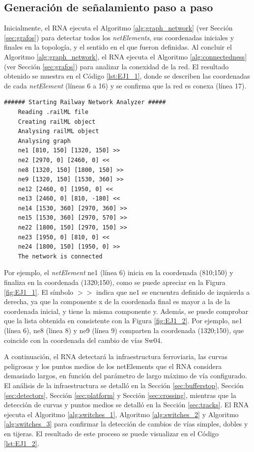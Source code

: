 \subsection{Generación de señalamiento paso a paso}
	
	Inicialmente, el RNA ejecuta el Algoritmo \ref{alg:graph_network} (ver Sección \ref{sec:grafos}) para detectar todos los \textit{netElements}, sus coordenadas iniciales y finales en la topología, y el sentido en el que fueron definidas. Al concluir el Algoritmo \ref{alg:graph_network}, el RNA ejecuta el Algoritmo \ref{alg:connectedness} (ver Sección \ref{sec:grafos}) para analizar la conexidad de la red. El resultado obtenido se muestra en el Código \ref{lst:EJ1_1}, donde se describen las coordenadas de cada \textit{netElement} (líneas 6 a 16) y se confirma que la red es conexa (línea 17).
	
	\begin{lstlisting}[language = {}, caption = Detección de \textit{netElements} por parte del RNA , label = {lst:EJ1_1}]
	###### Starting Railway Network Analyzer #####
	Reading .railML file
	Creating railML object
	Analysing railML object
	Analysing graph
	ne1 [810, 150] [1320, 150] >>
	ne2 [2970, 0] [2460, 0] <<
	ne8 [1320, 150] [1800, 150] >>
	ne9 [1320, 150] [1530, 360] >>
	ne12 [2460, 0] [1950, 0] <<
	ne13 [2460, 0] [810, -180] <<
	ne14 [1530, 360] [2970, 360] >>
	ne15 [1530, 360] [2970, 570] >>
	ne22 [1800, 150] [2970, 150] >>
	ne23 [1950, 0] [810, 0] <<
	ne24 [1800, 150] [1950, 0] >>
	The network is connected
	\end{lstlisting}
	
	Por ejemplo, el \textit{netElement} ne1 (línea 6) inicia en la coordenada (810;150) y finaliza en la coordenada (1320;150), como se puede apreciar en la Figura \ref{fig:EJ1_1}. El símbolo $>>$ indica que ne1 se encuentra definido de izquierda a derecha, ya que la componente x de la coordenada final es mayor a la de la coordenada inicial, y tiene la misma componente y. Además, se puede comprobar que la lista obtenida en consistente con la Figura \ref{fig:EJ1_2}. Por ejemplo, ne1 (línea 6), ne8 (linea 8) y ne9 (línea 9) comparten la coordenada (1320;150), que coincide con la coordenada del cambio de vías Sw04.
	
	A continuación, el RNA detectará la infraestructura ferroviaria, las curvas peligrosas y los puntos medios de los netElements que el RNA considera demasiado largos, en función del parámetro de largo máximo de vía configurado. El análisis de la infraestructura se detalló en la Sección \ref{sec:bufferstop}, Sección \ref{sec:detectors}, Sección \ref{sec:platform} y Sección \ref{sec:crossing}, mientras que la detección de curvas y puntos medios se detalló en la Sección \ref{sec:tracks}. El RNA ejecuta el Algoritmo \ref{alg:switches_1}, Algoritmo \ref{alg:switches_2} y Algoritmo \ref{alg:switches_3} para confirmar la detección de cambios de vías simples, dobles y en tijeras. El resultado de este proceso se puede visualizar en el Código \ref{lst:EJ1_2}.
	
